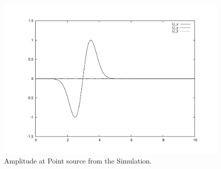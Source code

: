 \begin{figure}[t!]
\centerline{\includegraphics[width=4.in, angle=-90]{figures/WavePC}}
\caption{Amplitude at Point source from the Simulation.}
\label{WAVE FIG 1}
\end{figure}

